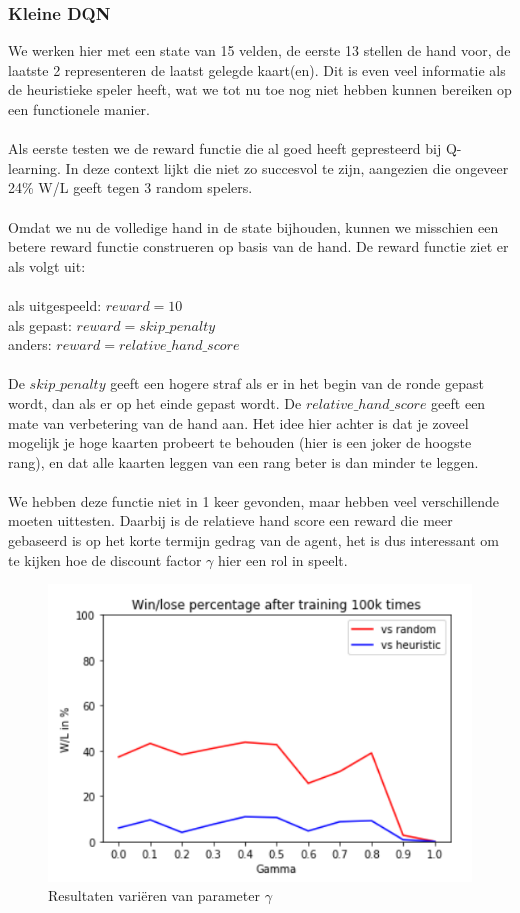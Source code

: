 \documentclass[11pt]{article}
\begin{document}
\subsubsection{Kleine DQN}
We werken hier met een state van 15 velden, de eerste 13 stellen de hand voor, de laatste 2 representeren de laatst gelegde kaart(en). Dit is even veel informatie als de heuristieke speler heeft, wat we tot nu toe nog niet hebben kunnen bereiken op een functionele manier.\\\\
Als eerste testen we de reward functie die al goed heeft gepresteerd bij Q-learning. In deze context lijkt die niet zo succesvol te zijn, aangezien die ongeveer 24\% W/L geeft tegen 3 random spelers. \\\\
Omdat we nu de volledige hand in de state bijhouden, kunnen we misschien een betere reward functie construeren op basis van de hand. De reward functie ziet er als volgt uit:\\\\
\indent als uitgespeeld: $reward = 10$\\
\indent als gepast: $reward = skip\_penalty$\\
\indent anders: $reward = relative\_hand\_score$\\\\
De $skip\_penalty$ geeft een hogere straf als er in het begin van de ronde gepast wordt, dan als er op het einde gepast wordt. De $relative\_hand\_score$ geeft een mate van verbetering van de hand aan. Het idee hier achter is dat je zoveel mogelijk je hoge kaarten probeert te behouden (hier is een joker de hoogste rang), en dat alle kaarten leggen van een rang beter is dan minder te leggen. \\\\
We hebben deze functie niet in 1 keer gevonden, maar hebben veel verschillende moeten uittesten. Daarbij is de relatieve hand score een reward die meer gebaseerd is op het korte termijn gedrag van de agent, het is dus interessant om te kijken hoe de discount factor $\gamma$ hier een rol in speelt.
\begin{figure}[H]
\centering
\includegraphics[scale=0.45]{images/gamma-iteratie-dqn.png}
\caption{Resultaten variëren van parameter $\gamma$}
\label{fig:gamma_iteratie_small_dqn}
\end{figure}
\end{document}
